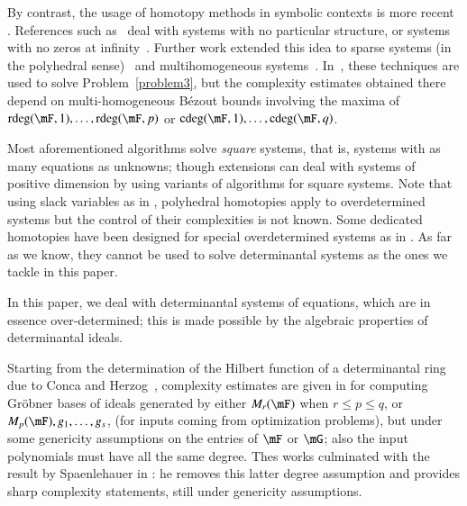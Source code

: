 By contrast, the usage of homotopy methods in symbolic contexts is
more recent%
. References such
as~\cite{HeKrPuSaWa99,BoMaWaWa04} deal with systems with no particular
structure, or systems with no zeros at infinity~\cite{PaSa04}.
Further work extended this idea to sparse systems (in the polyhedral
sense)~\cite{JeMaSoWa09,HeJeSa10,HeJeSa13,HeJeSa14} and
multihomogeneous systems~\cite{HeJeSaSo02,SaSc16}.  In~\cite{SaSc16},
these techniques are used to solve Problem~\eqref{problem3}, but the
complexity estimates obtained there depend on multi-homogeneous
B\'ezout bounds involving the maxima of $\rdeg(\mF, 1), \ldots,
\rdeg(\mF, p)$ or $\cdeg(\mF,1), \ldots, \cdeg(\mF, q)$.

Most aforementioned algorithms solve {\em square} systems, that is, systems with
as many equations as unknowns; though extensions can deal with systems of
positive dimension by using variants of algorithms for square systems. Note that
using slack variables as in \cite{SoVe00}, polyhedral homotopies apply to
overdetermined systems but the control of their complexities is not known. Some
dedicated homotopies have been designed for special overdetermined systems as in
\cite{BV00, SVV10}.
As far as we know, they cannot be used
to solve determinantal systems as the ones we tackle in this paper.

In this paper, we deal with determinantal
systems of equations, which are in essence over-determined; this is
made possible by the algebraic properties of determinantal ideals.

Starting from the determination of the Hilbert function of a determinantal ring
due to Conca and Herzog~\cite{CH94}, complexity estimates are given in
\cite{FSS13,FSS12} for computing Gr\"obner bases of ideals generated by either
$M_r(\mF)$ when $r\leq p\leq q$, or $M_{p}(\mF),g_1,\dots,g_s$, (for inputs
coming from optimization problems), but under some genericity assumptions on the
entries of $\mF$ or $\mG$; also the input polynomials must have all the same
degree. Thes works culminated with the result by Spaenlehauer in \cite{Spa14}:
he removes this latter degree assumption and provides sharp complexity
statements, still under genericity assumptions.

